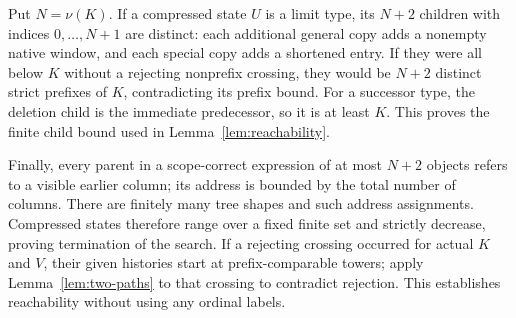 Put $N=\nu(K)$. If a compressed state $U$ is a limit type, its
$N+2$ children with indices $0,\ldots,N+1$ are distinct: each
additional general copy adds a nonempty native window, and each
special copy adds a shortened entry. If they were all below $K$
without a rejecting nonprefix crossing, they would be $N+2$ distinct
strict prefixes of $K$, contradicting its prefix bound. For a successor
type, the deletion child is the immediate predecessor, so it is at
least $K$. This proves the finite child bound used in
Lemma~\ref{lem:reachability}.

Finally, every parent in a scope-correct expression of at most $N+2$
objects refers to a visible earlier column; its address is bounded by
the total number of columns. There are finitely many tree shapes and
such address assignments. Compressed states therefore range over a
fixed finite set and strictly decrease, proving termination of the
search. If a rejecting crossing occurred for actual $K$ and $V$, their
given histories start at prefix-comparable towers; apply
Lemma~\ref{lem:two-paths} to that crossing to contradict rejection.
This establishes reachability without using any ordinal labels.
